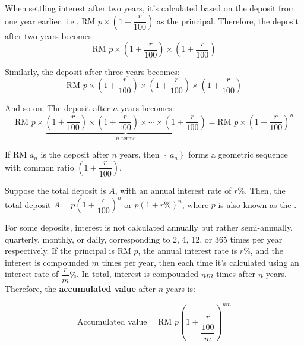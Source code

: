 \documentclass{report}
\begin{document}
        \vspace{-1em}
        When settling interest after two years, it's calculated based on the deposit from one year earlier, i.e., RM $p \times \left(1+\dfrac{r}{100}\right)$ as the principal. Therefore, the deposit after two years becomes:
        $$
        \text{RM } p \times \left(1+\dfrac{r}{100}\right) \times \left(1+\dfrac{r}{100}\right)
        $$

        \vspace{-1em}
        Similarly, the deposit after three years becomes:
        $$
        \text{RM } p \times \left(1+\dfrac{r}{100}\right) \times \left(1+\dfrac{r}{100}\right) \times \left(1+\dfrac{r}{100}\right)
        $$

        \vspace{-1em}
        And so on. The deposit after $n$ years becomes:
        $$
        \text{RM } p \times \underbrace{\left(1+\dfrac{r}{100}\right) \times \left(1+\dfrac{r}{100}\right) \times \cdots \times \left(1+\dfrac{r}{100}\right)}_{n \text{ terms}} = \text{RM } p \times \left(1+\dfrac{r}{100}\right)^n
        $$

        \vspace{-1em}
        If $\text{RM } a_n$ is the deposit after $n$ years, then $\left\{a_n\right\}$ forms a geometric sequence with common ratio $\left(1+\dfrac{r}{100}\right)$.

        Suppose the total deposit is $A$, with an annual interest rate of $r\%$. Then, the total deposit $A=p\left(1+\dfrac{r}{100}\right)^n$ or $p(1+r\%)^n$, where $p$ is also known as the .

        For some deposits, interest is not calculated annually but rather semi-annually, quarterly, monthly, or daily, corresponding to 2, 4, 12, or 365 times per year respectively. If the principal is RM $p$, the annual interest rate is $r\%$, and the interest is compounded $m$ times per year, then each time it's calculated using an interest rate of $\dfrac{r}{m}\%$. In total, interest is compounded $nm$ times after $n$ years. Therefore, the \textbf{accumulated value} after $n$ years is:
        
        \begin{info}
            $$
            \text{Accumulated value} = \text{RM }p\left(1+\dfrac{r}{\dfrac{100}{m}}\right)^{nm}
            $$
        \end{info}
\end{document}

